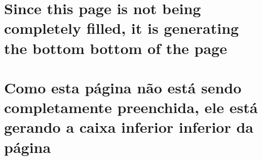 


%
%


\lang
{\chapter[Page not filled]{Since this page is not being completely filled, it is generating the bottom bottom of the page}}
{\chapter[Página não gerada]{Como esta página não está sendo completamente preenchida, ele está gerando a caixa inferior inferior da página}}


